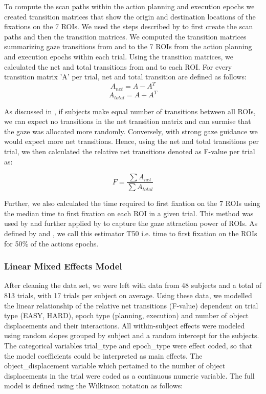 To compute the scan paths within the action planning and execution epochs we created transition matrices that show the origin and destination locations of the fixations on the 7 ROIs. We used the steps described by \citet{Hooge2013-bk} to first create the scan paths and then the transition matrices. We computed the transition matrices summarizing gaze transitions from and to the 7 ROIs from the action planning and execution epochs within each trial. Using the transition matrices, we calculated the net and total transitions from and to each ROI. For every transition matrix 'A' per trial, net and total transition are defined as follows:
\begin{equation}\label{eq:net_transitions}
     A_{net} = A - A^T
\end{equation}  
\begin{equation}\label{eq:total_transitions}
     A_{total} = A + A^T
\end{equation}  

As discussed in \citet{Hooge2013-bk}, if subjects make equal number of transitions between all ROIs, we can expect no transitions in the net transition matrix and can surmise that the gaze was allocated more randomly. Conversely, with strong gaze guidance we would expect more net transitions. Hence, using the net and total transitions per trial, we then calculated the relative net transitions denoted as F-value per trial as:

\begin{equation}\label{eq:f_value}
     F = \frac{\sum A_{net}}{\sum A_{total}}
\end{equation}  

Further, we also calculated the time required to first fixation on the 7 ROIs using the median time to first fixation on each ROI in a given trial. This method was used by  \citet{Montfoort2007-oa} and further applied by \citet{Hooge2013-bk} to capture the gaze attraction power of ROIs. As defined by \citet{Montfoort2007-oa} and \citet{Hooge2013-bk}, we call this estimator T50 i.e. time to first fixation on the ROIs for 50\% of the actions epochs.


\subsubsection{Linear Mixed Effects Model}
After cleaning the data set, we were left with data from 48 subjects and a total of 813 trials, with 17 trials per subject on average. Using these data, we modelled the linear relationship of the relative net transitions (F-value) dependent on trial type (EASY, HARD), epoch type (planning, execution) and number of object displacements and their interactions. All within-subject effects were modeled using random slopes grouped by subject and a random intercept for the subjects. The categorical variables trial\_type and epoch\_type were effect coded, so that the model coefficients could be interpreted as main effects. The object\_displacement variable which pertained to the number of object displacements in the trial were coded as a continuous numeric variable. The full model is defined using the Wilkinson notation as follows:

